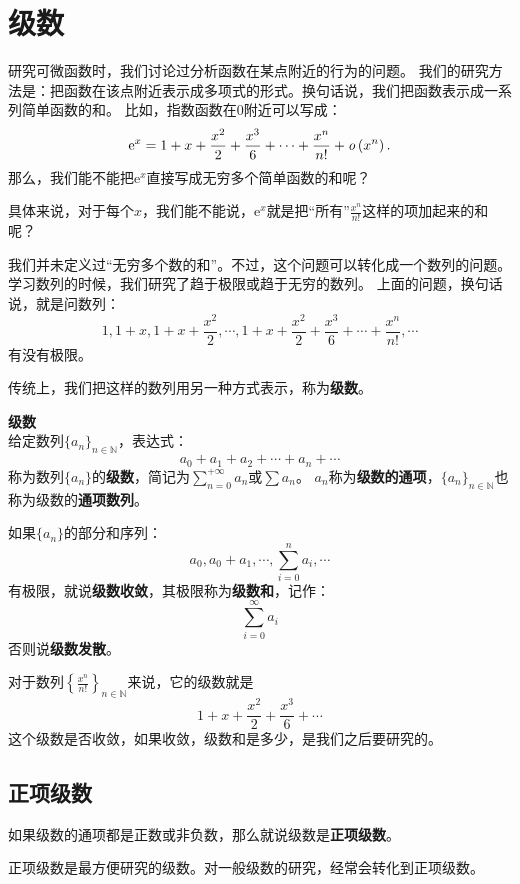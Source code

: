 \documentclass[12pt,UTF8]{ctexbook}
\begin{document}
\chapter{级数}
研究可微函数时，我们讨论过分析函数在某点附近的行为的问题。
我们的研究方法是：把函数在该点附近表示成多项式的形式。换句话说，我们把函数表示成一系列简单函数的和。
比如，指数函数在$0$附近可以写成：
$$\mathrm{e}^x = 1 + x + \frac{x^2}{2} + \frac{x^3}{6} + \cdots + \frac{x^n}{n!} + \mathit{o}\left(x^n\right).$$
那么，我们能不能把$\mathrm{e}^x$直接写成无穷多个简单函数的和呢？

具体来说，对于每个$x$，我们能不能说，$\mathrm{e}^x$就是把“所有”$\frac{x^n}{n!}$这样的项加起来的和呢？

我们并未定义过“无穷多个数的和”。不过，这个问题可以转化成一个数列的问题。
学习数列的时候，我们研究了趋于极限或趋于无穷的数列。
上面的问题，换句话说，就是问数列：
$$ 1, 1+x, 1+x + \frac{x^2}{2}, \cdots , 1 + x + \frac{x^2}{2} + \frac{x^3}{6} + \cdots + \frac{x^n}{n!}, \cdots $$
有没有极限。

传统上，我们把这样的数列用另一种方式表示，称为\textbf{级数}。

\begin{df}{\textbf{级数}}
    \mbox{} \\
    给定数列$\{a_n\}_{n\in\mathbb{N}}$，表达式：
    $$ a_0 + a_1 + a_2 + \cdots + a_n + \cdots $$
    称为数列$\{a_n\}$的\textbf{级数}，简记为$\sum_{n=0}^{+\infty} a_n$或$\sum a_n$。
    $a_n$称为\textbf{级数的通项}，$\{a_n\}_{n\in\mathbb{N}}$也称为级数的\textbf{通项数列}。
    
    如果$\{a_n\}$的部分和序列：
    $$ a_0, a_0 + a_1, \cdots , \sum_{i=0}^n a_i, \cdots $$
    有极限，就说\textbf{级数收敛}，其极限称为\textbf{级数和}，记作：
    $$ \sum_{i=0}^\infty a_i $$
    否则说\textbf{级数发散}。
    
\end{df}

对于数列$\left\{\frac{x^n}{n!}\right\}_{n\in\mathbb{N}}$来说，它的级数就是
$$ 1 + x + \frac{x^2}{2} + \frac{x^3}{6} + \cdots $$
这个级数是否收敛，如果收敛，级数和是多少，是我们之后要研究的。

\section{正项级数}

如果级数的通项都是正数或非负数，那么就说级数是\textbf{正项级数}。

正项级数是最方便研究的级数。对一般级数的研究，经常会转化到正项级数。
\end{document}
